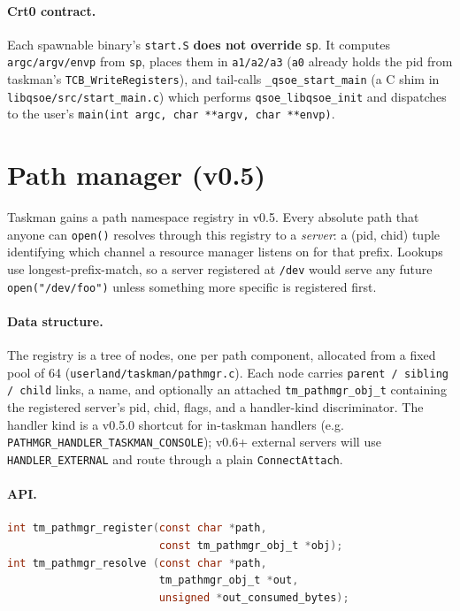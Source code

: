 \paragraph{Crt0 contract.}  Each spawnable binary's \texttt{start.S}
\textbf{does not override} \texttt{sp}.  It computes
\texttt{argc/argv/envp} from \texttt{sp}, places them in
\texttt{a1/a2/a3} (\texttt{a0} already holds the pid from taskman's
\texttt{TCB\_WriteRegisters}), and tail-calls
\texttt{\_qsoe\_start\_main} (a C shim in
\texttt{libqsoe/src/start\_main.c}) which performs
\texttt{qsoe\_libqsoe\_init} and dispatches to the user's
\texttt{main(int argc, char **argv, char **envp)}.

\section{Path manager (v0.5)}

Taskman gains a path namespace registry in v0.5.  Every absolute
path that anyone can \texttt{open()} resolves through this registry
to a \emph{server}: a (pid, chid) tuple identifying which channel a
resource manager listens on for that prefix.  Lookups use
longest-prefix-match, so a server registered at \texttt{/dev} would
serve any future \texttt{open("/dev/foo")} unless something more
specific is registered first.

\paragraph{Data structure.}  The registry is a tree of nodes, one
per path component, allocated from a fixed pool of 64
(\texttt{userland/taskman/pathmgr.c}).  Each node carries
\texttt{parent / sibling / child} links, a name, and optionally an
attached \texttt{tm\_pathmgr\_obj\_t} containing the registered
server's pid, chid, flags, and a handler-kind discriminator.  The
handler kind is a v0.5.0 shortcut for in-taskman handlers (e.g.
\texttt{PATHMGR\_HANDLER\_TASKMAN\_CONSOLE}); v0.6+ external
servers will use \texttt{HANDLER\_EXTERNAL} and route through a
plain \texttt{ConnectAttach}.

\paragraph{API.}
\begin{lstlisting}[language=C]
int tm_pathmgr_register(const char *path,
                        const tm_pathmgr_obj_t *obj);
int tm_pathmgr_resolve (const char *path,
                        tm_pathmgr_obj_t *out,
                        unsigned *out_consumed_bytes);
\end{lstlisting}

